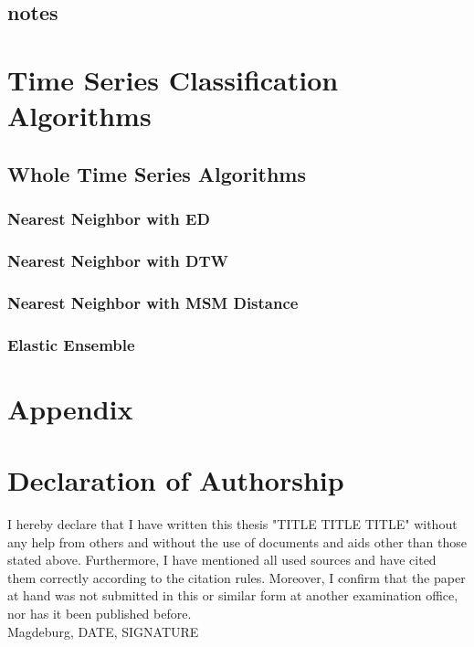 \subsection{notes}



\null\newpage

\section{Time Series Classification Algorithms}

\subsection{Whole Time Series Algorithms}

\subsubsection{Nearest Neighbor with ED}

\subsubsection{Nearest Neighbor with DTW}

\subsubsection{Nearest Neighbor with MSM Distance}

\subsubsection{Elastic Ensemble}



\null\newpage


\section{Appendix}

\null\newpage

% 
\printbibliography
\newpage

\section{Declaration of Authorship}
I hereby declare that I have written this thesis "TITLE TITLE TITLE"
without any help from others and without the use of documents and aids
other than those stated above. Furthermore, I have mentioned all used
sources and have cited them correctly according to the citation rules.
Moreover, I confirm that the paper at hand was not submitted in this or
similar form at another examination office, nor has it been published
before.
\\
Magdeburg, DATE, SIGNATURE